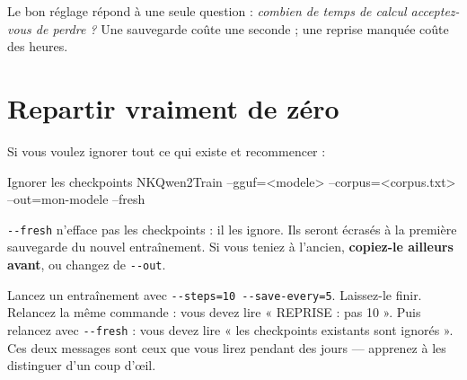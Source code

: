 \begin{nkretenir}
Le bon réglage répond à une seule question : \emph{combien de temps de calcul
acceptez-vous de perdre ?} Une sauvegarde coûte une seconde ; une reprise
manquée coûte des heures.
\end{nkretenir}

\section{Repartir vraiment de zéro}

Si vous voulez ignorer tout ce qui existe et recommencer :

\begin{nkcode}[]{Ignorer les checkpoints}
NKQwen2Train --gguf=<modele> --corpus=<corpus.txt> --out=mon-modele --fresh
\end{nkcode}

\begin{nkpiege}
\texttt{-{}-fresh} n'efface pas les checkpoints : il les ignore. Ils seront
écrasés à la première sauvegarde du nouvel entraînement. Si vous teniez à
l'ancien, \textbf{copiez-le ailleurs avant}, ou changez de \texttt{-{}-out}.
\end{nkpiege}

\begin{nkexo}
Lancez un entraînement avec \texttt{-{}-steps=10 -{}-save-every=5}. Laissez-le
finir. Relancez la même commande : vous devez lire « REPRISE : pas 10 ».
Puis relancez avec \texttt{-{}-fresh} : vous devez lire « les checkpoints
existants sont ignorés ». Ces deux messages sont ceux que vous lirez pendant
des jours — apprenez à les distinguer d'un coup d'œil.
\end{nkexo}

